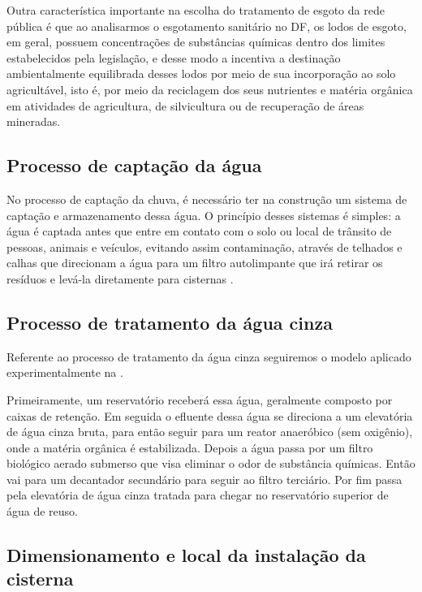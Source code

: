 	Outra característica importante na escolha do tratamento de esgoto da rede pública é que ao analisarmos o esgotamento sanitário no DF, os lodos de esgoto, em geral, possuem concentrações de substâncias químicas dentro dos limites estabelecidos pela legislação, e desse modo a \cite{CAESB} incentiva a destinação ambientalmente equilibrada desses lodos por meio de sua incorporação ao solo agricultável, isto é, por meio da reciclagem dos seus nutrientes e matéria orgânica em atividades de agricultura, de silvicultura ou de recuperação de áreas mineradas.

\subsection{Processo de captação da água}

	No processo de captação da chuva, é necessário ter na construção um sistema de captação e armazenamento dessa água. O princípio desses sistemas é simples: a água é captada antes que entre em contato com o solo ou local de trânsito de pessoas, animais e veículos, evitando assim contaminação, através de telhados e calhas que direcionam a água para um filtro autolimpante que irá retirar os resíduos e levá-la diretamente para cisternas \cite{EMBRAPA}.


\subsection{Processo de tratamento da água cinza}

	Referente ao processo de tratamento da água cinza seguiremos o modelo aplicado experimentalmente na \cite{UFES}.

	Primeiramente, um reservatório receberá essa água, geralmente composto por caixas de retenção. Em seguida o efluente dessa água se direciona a um elevatória de água cinza bruta, para então seguir para um reator anaeróbico (sem oxigênio), onde a matéria orgânica é estabilizada. Depois a água passa por um filtro biológico aerado submerso que visa eliminar o odor de substância químicas. Então vai para um decantador secundário para seguir ao filtro terciário. Por fim passa pela elevatória de água cinza tratada para chegar no reservatório superior de água de reuso.

\subsection{Dimensionamento e local da instalação da cisterna}

